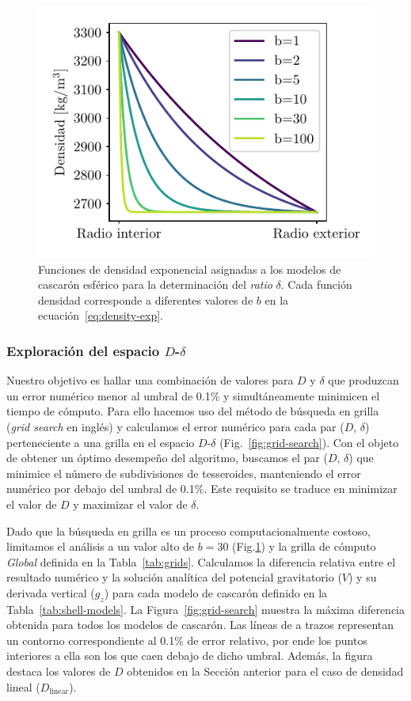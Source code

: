 \begin{figure}
\centering
\includegraphics[width=0.5\linewidth]{figs/tesseroids-variable-density/exponential-densities.pdf}
\caption{
    Funciones de densidad exponencial asignadas a los modelos de cascarón
    esférico para la determinación del \emph{ratio} $\delta$.
    Cada función densidad corresponde a diferentes valores de $b$ en la
    ecuación~\ref{eq:density-exp}.
}
\label{fig:exp-densities}
\end{figure}


\subsubsection{Exploración del espacio $D$-$\delta$}

Nuestro objetivo es hallar una combinación de valores para $D$ y $\delta$ que
produzcan un error numérico menor al umbral de 0.1\% y simultáneamente
minimicen el tiempo de cómputo.
Para ello hacemos uso del método de búsqueda en grilla (\emph{grid search} en
inglés) y calculamos el error numérico para cada par ($D$, $\delta$)
perteneciente a una grilla en el espacio $D$-$\delta$
(Fig.~\ref{fig:grid-search}).
Con el objeto de obtener un óptimo desempeño del algoritmo, buscamos el par
($D$, $\delta$) que minimice el número de subdivisiones de tesseroides,
manteniendo el error numérico por debajo del umbral de 0.1\%.
Este requisito se traduce en minimizar el valor de $D$ y maximizar el valor de
$\delta$.

Dado que la búsqueda en grilla es un proceso computacionalmente costoso,
limitamos el análisis a un valor alto de $b=30$ (Fig.\ref{fig:exp-densities})
y la grilla de cómputo \emph{Global} definida en la Tabla~\ref{tab:grids}.
Calculamos la diferencia relativa entre el resultado numérico y la solución
analítica del potencial gravitatorio ($V$) y su derivada vertical ($g_z$) para
cada modelo de cascarón definido en la Tabla~\ref{tab:shell-models}.
La Figura~\ref{fig:grid-search} muestra la máxima diferencia obtenida para
todos los modelos de cascarón.
Las líneas de a trazos representan un contorno correspondiente al 0.1\% de
error relativo, por ende los puntos interiores a ella son los que caen debajo
de dicho umbral.
Además, la figura destaca los valores de $D$ obtenidos en la Sección anterior
para el caso de densidad lineal ($D_\text{linear}$).

